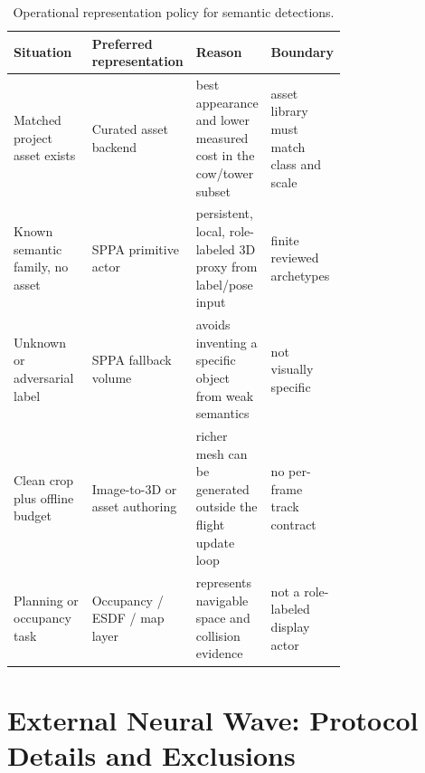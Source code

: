 \documentclass[10pt]{article}
\begin{document}
\begin{table}[H]
\centering
\footnotesize
\setlength{\tabcolsep}{4pt}
\renewcommand{\arraystretch}{1.10}
\caption{Operational representation policy for semantic detections.}
\label{tab:representation-design-space}
\begin{tabularx}{\linewidth}{@{}L{0.28\linewidth}L{0.25\linewidth}Y L{0.20\linewidth}@{}}
\toprule
Situation & Preferred representation & Reason & Boundary \\
\midrule
Matched project asset exists & Curated asset backend & best appearance and lower measured cost in the cow/tower subset & asset library must match class and scale \\
Known semantic family, no asset & SPPA primitive actor & persistent, local, role-labeled 3D proxy from label/pose input & finite reviewed archetypes \\
Unknown or adversarial label & SPPA fallback volume & avoids inventing a specific object from weak semantics & not visually specific \\
Clean crop plus offline budget & Image-to-3D or asset authoring & richer mesh can be generated outside the flight update loop & no per-frame track contract \\
Planning or occupancy task & Occupancy / ESDF / map layer & represents navigable space and collision evidence & not a role-labeled display actor \\
\bottomrule
\end{tabularx}
\end{table}


\section{External Neural Wave: Protocol Details and Exclusions}
\label{sec:supp-neural-protocol}
\end{document}
